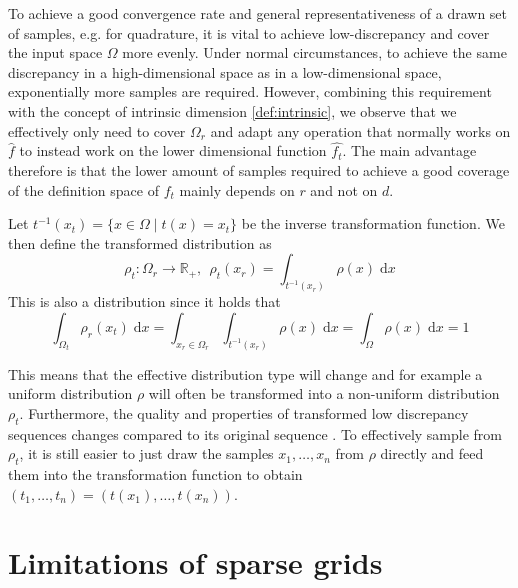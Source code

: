 \documentclass[
  a4paper,  %
  twoside,  %
  bibliography=totoc,
  headsepline,
  cleardoublepage=empty,
  parskip=half,
  draft=false
]{scrbook}
\begin{document}
To achieve a good convergence rate and general representativeness of a drawn set of samples, e.g. for quadrature, it is vital to achieve low-discrepancy and cover the input space $\Omega$ more evenly.
Under normal circumstances, to achieve the same discrepancy in a high-dimensional space as in a low-dimensional space,
exponentially more samples are required.
However, combining this requirement with the concept of intrinsic dimension \cref{def:intrinsic}, we observe that we effectively only need to cover $\Omega_r$ and adapt any operation that normally works on $\hat{f}$ to instead work on the lower dimensional function $\hat{f_t}$.
The main advantage therefore is that the lower amount of samples required to achieve a good coverage of the definition space of $f_t$ mainly depends on $r$ and not on $d$.
\begin{definition}
Let $t^{-1}(x_{t})=\{x \in \Omega \mid t(x)=x_{t}\}$ be the inverse transformation function.
We then define the transformed distribution as
\begin{equation}
\rho_t \colon \Omega_r \to \mathds{R_+}, ~~ \rho_t(x_r)=\int_{t^{-1}(x_r)} \rho(x) \; \text{d}x 
\end{equation}
This is also a distribution since it holds that
\begin{equation}
\int_{\Omega_t} \rho_r(x_t) \; \text{d}x=\int_{x_r \in \Omega_r} \int_{t^{-1}(x_r)} \rho(x) \; \text{d}x = \int_{\Omega} \rho(x) \; \text{d}x = 1
\end{equation}
\end{definition}
This means that the effective distribution type will change and for example a uniform distribution $\rho$ will often be transformed into a non-uniform distribution $\rho_t$.
Furthermore, the quality and properties of transformed low discrepancy sequences changes compared to its original sequence \cite{}.
To effectively sample from $\rho_t$, it is still easier to just draw the samples $x_1, \dots, x_n$ from $\rho$ directly and feed them into the transformation function to obtain $(t_1, \dots, t_n)=(t(x_1), \dots, t(x_n))$.

\section{Limitations of sparse grids}
\end{document}
